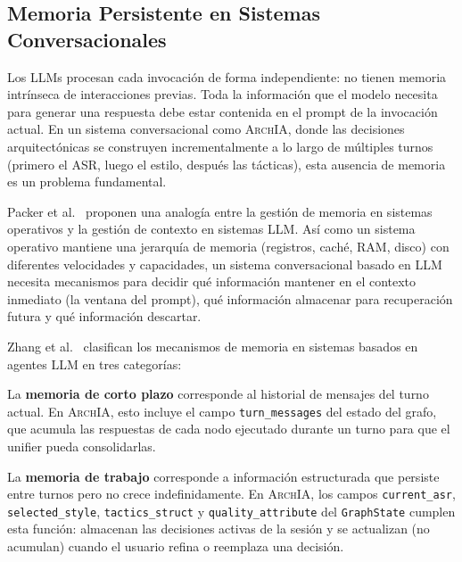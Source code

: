 \documentclass[12pt, letterpaper, oneside]{article}
\newcommand{\archia}{\textsc{ArchIA}}
\begin{document}
\subsection{Memoria Persistente en Sistemas Conversacionales}
\label{subsec:memoria}


Los LLMs procesan cada invocación de forma independiente: no tienen memoria
intrínseca de interacciones previas. Toda la información que el modelo necesita
para generar una respuesta debe estar contenida en el prompt de la invocación
actual. En un sistema conversacional como \archia{}, donde las decisiones
arquitectónicas se construyen incrementalmente a lo largo de múltiples turnos
(primero el ASR, luego el estilo, después las tácticas), esta ausencia de memoria
es un problema fundamental.

Packer et al.~\cite{packer2023memgpt} proponen una analogía entre la gestión de
memoria en sistemas operativos y la gestión de contexto en sistemas LLM. Así como
un sistema operativo mantiene una jerarquía de memoria (registros, caché, RAM,
disco) con diferentes velocidades y capacidades, un sistema conversacional basado
en LLM necesita mecanismos para decidir qué información mantener en el contexto
inmediato (la ventana del prompt), qué información almacenar para recuperación
futura y qué información descartar.

Zhang et al.~\cite{zhang2024survey} clasifican los mecanismos de memoria en
sistemas basados en agentes LLM en tres categorías:

La \textbf{memoria de corto plazo} corresponde al historial de mensajes del turno
actual. En \archia{}, esto incluye el campo \texttt{turn\_messages} del estado del
grafo, que acumula las respuestas de cada nodo ejecutado durante un turno para que
el unifier pueda consolidarlas.

La \textbf{memoria de trabajo} corresponde a información estructurada que persiste
entre turnos pero no crece indefinidamente. En \archia{}, los campos
\texttt{current\_asr}, \texttt{selected\_style}, \texttt{tactics\_struct} y
\texttt{quality\_attribute} del \texttt{GraphState} cumplen esta función: almacenan
las decisiones activas de la sesión y se actualizan (no acumulan) cuando el usuario
refina o reemplaza una decisión.
\end{document}
